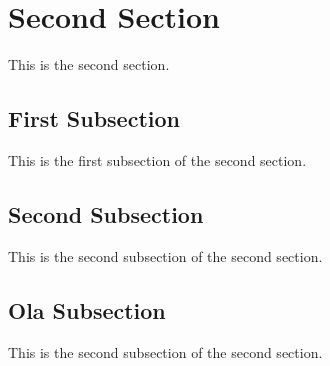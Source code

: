 \section{Second Section}\label{sec:second}
This is the second section.

\subsection{First Subsection}\label{sub:third}
This is the first subsection of the second section.

\subsection{Second Subsection}\label{sub:fourth}
This is the second subsection of the second section.

\subsection{Ola Subsection}\label{sub:ola}
This is the second subsection of the second section.